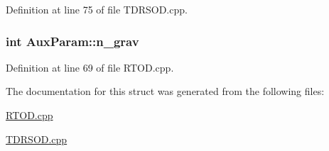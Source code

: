 Definition at line 75 of file T\-D\-R\-S\-O\-D.\-cpp.

\hypertarget{structAuxParam_a18fb836f348b92544dc701bb831ab366}{
\subsubsection[{n\-\_\-grav}]{\setlength{\rightskip}{0pt plus 5cm}int Aux\-Param\-::n\-\_\-grav}}\label{structAuxParam_a18fb836f348b92544dc701bb831ab366}


Definition at line 69 of file R\-T\-O\-D.\-cpp.



The documentation for this struct was generated from the following files\-:\begin{DoxyCompactItemize}
\item 
\hyperlink{RTOD_8cpp}{R\-T\-O\-D.\-cpp}\item 
\hyperlink{TDRSOD_8cpp}{T\-D\-R\-S\-O\-D.\-cpp}\end{DoxyCompactItemize}
